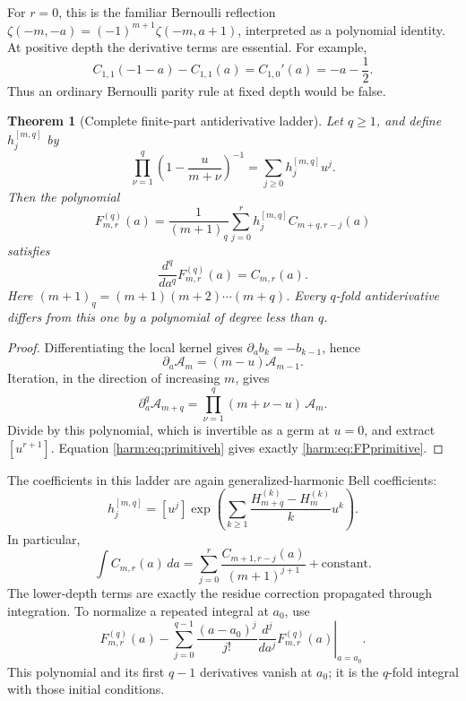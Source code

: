 \documentclass[11pt,letterpaper]{article}
\numberwithin{equation}{section}
\theoremstyle{plain}
\newtheorem{theorem}{Theorem}[section]
\theoremstyle{definition}
\theoremstyle{remark}
\begin{document}
For \(r=0\), this is the familiar Bernoulli reflection
\(\zeta(-m,-a)=(-1)^{m+1}\zeta(-m,a+1)\), interpreted as a polynomial
identity. At positive depth the derivative terms are essential.
For example,
\[
 C_{1,1}(-1-a)-C_{1,1}(a)
 =C_{1,0}'(a)=-a-\frac12.
\]
Thus an ordinary Bernoulli parity rule at fixed depth would be false.

\begin{theorem}[Complete finite-part antiderivative ladder]
\label{harm:thm:FPprimitives}
Let \(q\geq1\), and define \(h_j^{[m,q]}\) by
\begin{equation}\label{harm:eq:primitiveh}
 \prod_{\nu=1}^{q}
       \left(1-\frac{u}{m+\nu}\right)^{-1}
       =\sum_{j\geq0}h_j^{[m,q]}u^j.
\end{equation}
Then the polynomial
\begin{equation}\label{harm:eq:FPprimitive}
 F_{m,r}^{(q)}(a)=
 \frac{1}{(m+1)_q}
 \sum_{j=0}^{r}h_j^{[m,q]}C_{m+q,r-j}(a)
\end{equation}
satisfies
\[
 \frac{d^q}{da^q}F_{m,r}^{(q)}(a)=C_{m,r}(a).
\]
Here \((m+1)_q=(m+1)(m+2)\cdots(m+q)\).
Every \(q\)-fold antiderivative differs from this one by a polynomial
of degree less than \(q\).
\end{theorem}

\begin{proof}
Differentiating the local kernel gives
\(\partial_a b_k=-b_{k-1}\), hence
\[
 \partial_a\mathcal A_m=(m-u)\mathcal A_{m-1}.
\]
Iteration, in the direction of increasing \(m\), gives
\[
 \partial_a^q\mathcal A_{m+q}
       =\prod_{\nu=1}^{q}(m+\nu-u)\,\mathcal A_m.
\]
Divide by this polynomial, which is invertible as a germ at \(u=0\),
and extract \([u^{r+1}]\). Equation
\eqref{harm:eq:primitiveh} gives exactly
\eqref{harm:eq:FPprimitive}.
\end{proof}

The coefficients in this ladder are again generalized-harmonic
Bell coefficients:
\[
 h_j^{[m,q]}=[u^j]\exp\left(
   \sum_{k\geq1}\frac{H_{m+q}^{(k)}-H_m^{(k)}}{k}u^k
                              \right).
\]
In particular,
\begin{equation}\label{harm:eq:firstFPprimitive}
 \int C_{m,r}(a)\,da
 =\sum_{j=0}^{r}\frac{C_{m+1,r-j}(a)}{(m+1)^{j+1}}
   +\text{constant}.
\end{equation}
The lower-depth terms are exactly the residue correction propagated
through integration. To normalize a repeated integral at \(a_0\), use
\[
 F_{m,r}^{(q)}(a)
 -\sum_{j=0}^{q-1}
       \frac{(a-a_0)^j}{j!}
       \left.\frac{d^j}{da^j}F_{m,r}^{(q)}(a)\right|_{a=a_0}.
\]
This polynomial and its first \(q-1\) derivatives vanish at \(a_0\);
it is the \(q\)-fold integral with those initial conditions.
\end{document}
